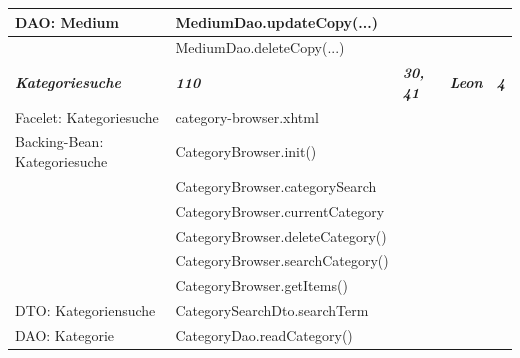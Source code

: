 \documentclass{article}
\begin{document}
\begin{longtable}{|l|l|l|l|l|}
\hline
DAO: Medium                             & MediumDao.updateCopy(...)                &                           &                             &                        \\ 
\hline
                                        & MediumDao.deleteCopy(...)                &                           &                             &                        \\ 
\hline
\textbf{\textit{Kategoriesuche}}        & \textbf{\textit{110}}                    & \textbf{\textit{30, 41}}  & \textbf{\textit{Leon}}      & \textbf{\textit{4}}    \\ 
\hline
Facelet: Kategoriesuche                 & category-browser.xhtml                   &                           &                             &                        \\ 
\hline
Backing-Bean: Kategoriesuche            & CategoryBrowser.init()                   &                           &                             &                        \\ 
\hline
                                        & CategoryBrowser.categorySearch           &                           &                             &                        \\ 
\hline
                                        & CategoryBrowser.currentCategory          &                           &                             &                        \\ 
\hline
                                        & CategoryBrowser.deleteCategory()         &                           &                             &                        \\ 
\hline
                                        & CategoryBrowser.searchCategory()         &                           &                             &                        \\ 
\hline
                                        & CategoryBrowser.getItems()               &                           &                             &                        \\ 
\hline
DTO: Kategoriensuche                    & CategorySearchDto.searchTerm             &                           &                             &                        \\ 
\hline
DAO: Kategorie                          & CategoryDao.readCategory()               &                           &                             &                        \\ 

\end{longtable}
\end{document}
